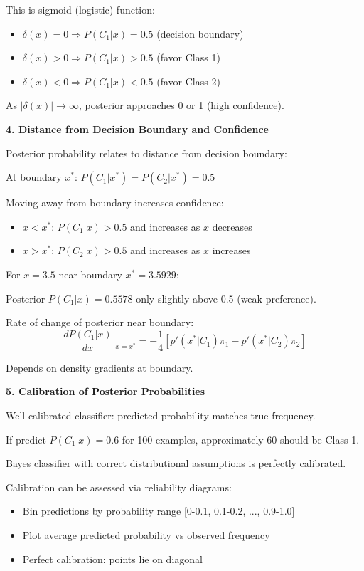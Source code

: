 \documentclass[12pt]{article}
\begin{document}
\begin{explanation}
This is sigmoid (logistic) function:
\begin{itemize}
\item $\delta(x) = 0 \Rightarrow P(C_1|x) = 0.5$ (decision boundary)
\item $\delta(x) > 0 \Rightarrow P(C_1|x) > 0.5$ (favor Class 1)
\item $\delta(x) < 0 \Rightarrow P(C_1|x) < 0.5$ (favor Class 2)
\end{itemize}

As $|\delta(x)| \to \infty$, posterior approaches 0 or 1 (high confidence).

\textbf{4. Distance from Decision Boundary and Confidence}

Posterior probability relates to distance from decision boundary:

At boundary $x^*$: $P(C_1|x^*) = P(C_2|x^*) = 0.5$

Moving away from boundary increases confidence:
\begin{itemize}
\item $x < x^*$: $P(C_1|x) > 0.5$ and increases as $x$ decreases
\item $x > x^*$: $P(C_2|x) > 0.5$ and increases as $x$ increases
\end{itemize}

For $x = 3.5$ near boundary $x^* = 3.5929$:

Posterior $P(C_1|x) = 0.5578$ only slightly above 0.5 (weak preference).

Rate of change of posterior near boundary:
\[\frac{dP(C_1|x)}{dx}\Big|_{x=x^*} = -\frac{1}{4}[p'(x^*|C_1)\pi_1 - p'(x^*|C_2)\pi_2]\]

Depends on density gradients at boundary.

\textbf{5. Calibration of Posterior Probabilities}

Well-calibrated classifier: predicted probability matches true frequency.

If predict $P(C_1|x) = 0.6$ for 100 examples, approximately 60 should be Class 1.

Bayes classifier with correct distributional assumptions is perfectly calibrated.

Calibration can be assessed via reliability diagrams:
\begin{itemize}
\item Bin predictions by probability range [0-0.1, 0.1-0.2, ..., 0.9-1.0]
\item Plot average predicted probability vs observed frequency
\item Perfect calibration: points lie on diagonal
\end{itemize}


\end{explanation}
\end{document}
